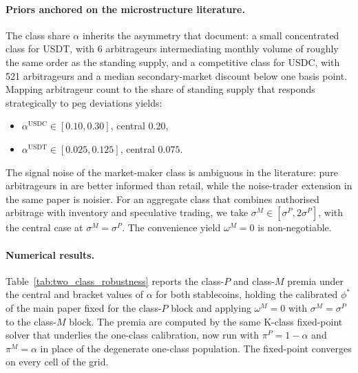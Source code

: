\paragraph{Priors anchored on the microstructure literature.} The class share $\alpha$ inherits the asymmetry that \citet{ma_zeng_zhang_2025} document: a small concentrated class for USDT, with 6 arbitrageurs intermediating monthly volume of roughly the same order as the standing supply, and a competitive class for USDC, with 521 arbitrageurs and a median secondary-market discount below one basis point. Mapping arbitrageur count to the share of standing supply that responds strategically to peg deviations yields:
\begin{itemize}
\item $\alpha^{\text{USDC}} \in [0.10, 0.30]$, central $0.20$,
\item $\alpha^{\text{USDT}} \in [0.025, 0.125]$, central $0.075$.
\end{itemize}
The signal noise of the market-maker class is ambiguous in the literature: pure arbitrageurs in \citet{ma_zeng_zhang_2025} are better informed than retail, while the noise-trader extension in the same paper is noisier. For an aggregate class that combines authorised arbitrage with inventory and speculative trading, we take $\sigma^M \in [\sigma^P, 2 \sigma^P]$, with the central case at $\sigma^M = \sigma^P$. The convenience yield $\omega^M = 0$ is non-negotiable.

\paragraph{Numerical results.} Table~\ref{tab:two_class_robustness} reports the class-$P$ and class-$M$ premia under the central and bracket values of $\alpha$ for both stablecoins, holding the calibrated $\phi^*$ of the main paper fixed for the class-$P$ block and applying $\omega^M = 0$ with $\sigma^M = \sigma^P$ to the class-$M$ block. The premia are computed by the same K-class fixed-point solver that underlies the one-class calibration, now run with $\pi^P = 1 - \alpha$ and $\pi^M = \alpha$ in place of the degenerate one-class population. The fixed-point converges on every cell of the grid.

